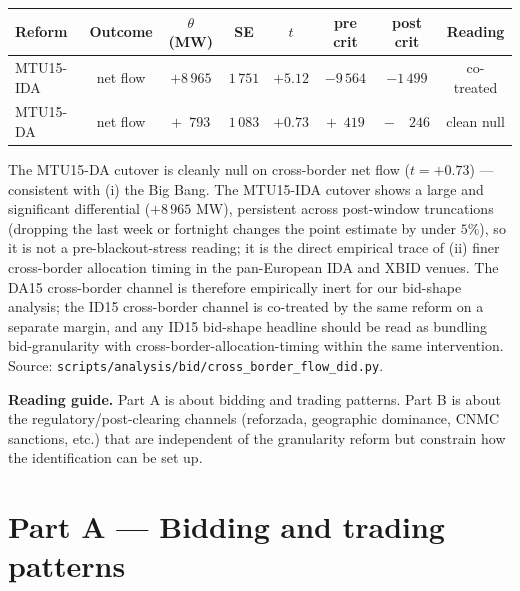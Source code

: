 \documentclass[11pt,a4paper]{article}
\begin{document}
\begin{center}
\footnotesize
\setlength{\tabcolsep}{6pt}
\begin{tabular}{l c c c c c c c}
\toprule
\textbf{Reform} & \textbf{Outcome} & \textbf{$\theta$ (MW)} & \textbf{SE} & \textbf{$t$} & \textbf{pre crit} & \textbf{post crit} & \textbf{Reading} \\
\midrule
MTU15-IDA & net flow & $+8\,965$ & $1\,751$ & $+5.12$ & $-9\,564$ & $-1\,499$ & co-treated \\
MTU15-DA  & net flow & $+\phantom{0}793$ & $1\,083$ & $+0.73$ & $+\phantom{0}419$ & $-\phantom{00}246$ & clean null \\
\bottomrule
\end{tabular}
\end{center}

\noindent The MTU15-DA cutover is cleanly null on cross-border net flow ($t=+0.73$) --- consistent with (i) the Big Bang. The MTU15-IDA cutover shows a large and significant differential ($+8\,965$ MW), persistent across post-window truncations (dropping the last week or fortnight changes the point estimate by under $5\%$), so it is not a pre-blackout-stress reading; it is the direct empirical trace of (ii) finer cross-border allocation timing in the pan-European IDA and XBID venues. The DA15 cross-border channel is therefore empirically inert for our bid-shape analysis; the ID15 cross-border channel is co-treated by the same reform on a separate margin, and any ID15 bid-shape headline should be read as bundling bid-granularity with cross-border-allocation-timing within the same intervention. Source: \texttt{scripts/analysis/bid/cross\_border\_flow\_did.py}.

\bigskip

\noindent\textbf{Reading guide.} Part A is about bidding and trading patterns. Part B is about the regulatory/post-clearing channels (reforzada, geographic dominance, CNMC sanctions, etc.) that are independent of the granularity reform but constrain how the identification can be set up.

\part{Part A --- Bidding and trading patterns}
\end{document}
